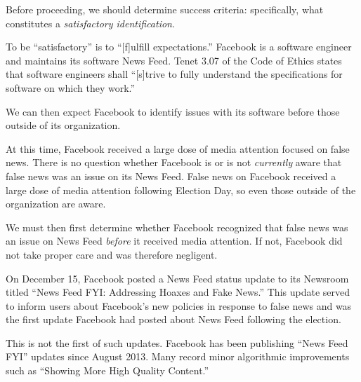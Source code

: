 
\par Before proceeding, we should determine success criteria: specifically, what constitutes a \emph{satisfactory identification}.

\par To be ``satisfactory'' is to ``[f]ulfill expectations.'' \cite{oxford} Facebook is a software engineer and maintains its software News Feed. Tenet 3.07 of the Code of Ethics states that software engineers shall ``[s]trive to fully understand the specifications for software on which they work.'' \cite{se_code}

\par We can then expect Facebook to identify issues with its software before those outside of its organization.

\par At this time, Facebook received a large dose of media attention focused on false news. \cite{tc_snowden} There is no question whether Facebook is or is not \emph{currently} aware that false news was an issue on its News Feed. False news on Facebook received a large dose of media attention following Election Day, so even those outside of the organization are aware. \cite{tc_snowden}

\par We must then first determine whether Facebook recognized that false news was an issue on News Feed \emph{before} it received media attention. If not, Facebook did not take proper care and was therefore negligent.

\label{recognize}

\par On December 15, Facebook posted a News Feed status update to its Newsroom titled ``News Feed FYI: Addressing Hoaxes and Fake News.'' \cite{fb_hoaxes_2016} This update served to inform users about Facebook's new policies in response to false news and was the first update Facebook had posted about News Feed following the election. \cite{fb_hoaxes_2016}

\par This is not the first of such updates. Facebook has been publishing ``News Feed FYI'' updates since August 2013. \cite{fb_newsroom} Many record minor algorithmic improvements such as ``Showing More High Quality Content.'' \cite{fb_newsroom} 

